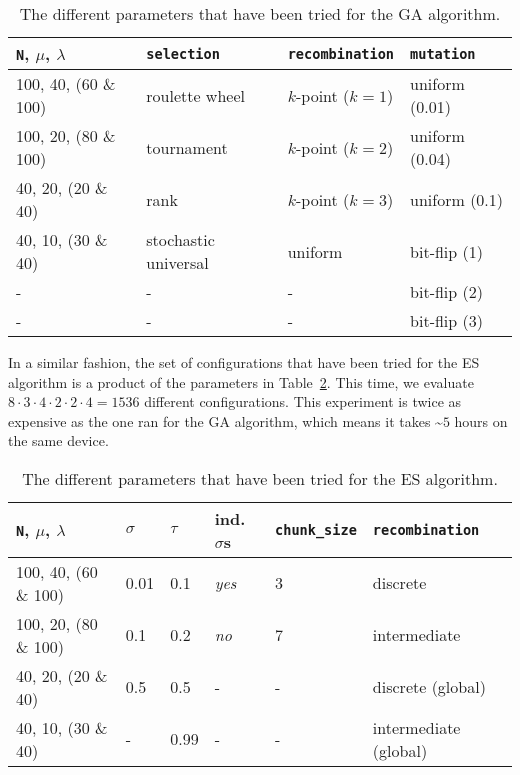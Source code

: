 \documentclass{article}
\begin{document}
\begin{table}[htbp]
    \centering
    \begin{tabular}{llll}
        \toprule
        \texttt{N}, $\mu$, $\lambda$ & \texttt{selection}   & \texttt{recombination} & \texttt{mutation} \\
        \midrule
        100, 40, (60 \& 100)         & roulette wheel       & $k$-point ($k=1$)      & uniform (0.01)    \\
        100, 20, (80 \& 100)         & tournament           & $k$-point ($k=2$)      & uniform (0.04)    \\
        40, 20, (20 \& 40)           & rank                 & $k$-point ($k=3$)      & uniform (0.1)     \\
        40, 10, (30 \& 40)           & stochastic universal & uniform                & bit-flip (1)      \\
        -                            & -                    & -                      & bit-flip (2)      \\
        -                            & -                    & -                      & bit-flip (3)      \\
        \bottomrule
    \end{tabular}
    \vspace{0.1cm}
    \caption{The different parameters that have been tried for the GA algorithm.}
    \label{tab:GA_params}
\end{table}

In a similar fashion, the set of configurations that have been tried for the ES algorithm is a product of the parameters in Table~\ref{tab:ES_params}.
This time, we evaluate $8 \cdot 3 \cdot 4 \cdot 2 \cdot 2 \cdot 4 = 1536$ different configurations.
This experiment is twice as expensive as the one ran for the GA algorithm, which means it takes \textasciitilde $5$ hours on the same device.

\begin{table}[htbp]
    \centering
    \begin{tabular}{llllll}
        \toprule
        \texttt{N}, $\mu$, $\lambda$ & $\sigma$ & $\tau$ & ind. $\sigma$s & \texttt{chunk\_size} & \texttt{recombination}       \\
        \midrule
        100, 40, (60 \& 100)         & 0.01     & 0.1    & \textit{yes}         & 3                    & discrete               \\
        100, 20, (80 \& 100)         & 0.1      & 0.2    & \textit{no}          & 7                    & intermediate           \\
        40, 20, (20 \& 40)           & 0.5      & 0.5    & -                    & -                    & discrete (global)      \\
        40, 10, (30 \& 40)           & -        & 0.99   & -                    & -                    & intermediate (global)  \\
        \bottomrule
    \end{tabular}
    \vspace{0.1cm}
    \caption{The different parameters that have been tried for the ES algorithm.}
    \label{tab:ES_params}
\end{table}
\end{document}

